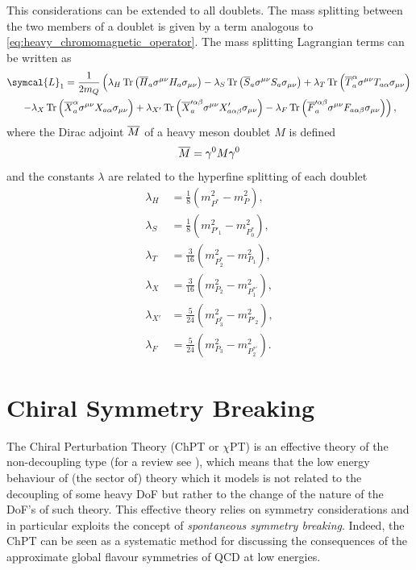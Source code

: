 This considerations can be extended to all doublets. The mass splitting between the two members of a doublet is given by a term analogous to \eqref{eq:heavy_chromomagnetic_operator}. The mass splitting Lagrangian terms can be written as
\begin{multline}
  \symcal{L}_1 = \frac{1}{2 m_Q} \left( 
      \lambda_H \tr{\left( \adj{H}_a \sigma^{\mu \nu} H_a \sigma_{\mu \nu} \right)} 
    - \lambda_S \tr{\left( \adj{S}_a \sigma^{\mu \nu} S_a \sigma_{\mu \nu} \right)}
    + \lambda_T \tr{\left( \adj{T}^\alpha_a \sigma^{\mu \nu} T_{a \alpha} \sigma_{\mu \nu} \right)} 
    \right. \\ \left.
    - \lambda_X \tr{\left( \adj{X}^\alpha_a \sigma^{\mu \nu} X_{a \alpha} \sigma_{\mu \nu} \right)} 
    + \lambda_{X'} \tr{\left( \adj{X}^{\prime \alpha \beta}_a \sigma^{\mu \nu} X'_{a \alpha \beta} \sigma_{\mu \nu} \right)} 
    - \lambda_F \tr{\left( \adj{F}^{\prime \alpha \beta}_a \sigma^{\mu \nu} F_{a \alpha \beta} \sigma_{\mu \nu} \right)} 
  \right) ,
\end{multline}
where the Dirac adjoint $\overline{M}$ of a heavy meson doublet $M$ is defined
\begin{equation}
  \overline{M} = \gamma^0 M \gamma^0
\end{equation}
and the constants $\lambda$ are related to the hyperfine splitting of each doublet
\begin{subequations}
  \begin{align}
    \lambda_H &= \frac{1}{8} \left( m^2_{P^*} - m^2_P \right) , \\
    \lambda_S &= \frac{1}{8} \left( m^2_{P'_1} - m^2_{P^*_0} \right) , \\
    \lambda_T &= \frac{3}{16} \left( m^2_{P^*_2} - m^2_{P_1} \right) , \\
    \lambda_X &= \frac{3}{16} \left( m^2_{P_2} - m^2_{P^{* \prime}_1} \right) , \\
    \lambda_{X'} &= \frac{5}{24} \left( m^2_{P^*_3} - m^2_{P'_2} \right) , \\
    \lambda_F &= \frac{5}{24} \left( m^2_{P_3} - m^2_{P^{* \prime}_2} \right) .
  \end{align}
\end{subequations}

\section{Chiral Symmetry Breaking}

The Chiral Perturbation Theory (ChPT or $\chi$PT) is an effective theory of the non-decoupling type (for a review see \cite{Scherer:2002tk}), which means that the low energy behaviour of (the sector of) theory which it models is not related to the decoupling of some heavy DoF but rather to the change of the nature of the DoF's of such theory. This effective theory relies on symmetry considerations and in particular exploits the concept of \emph{spontaneous symmetry breaking}. Indeed, the ChPT can be seen as a systematic method for discussing the consequences of the approximate global flavour symmetries of QCD at low energies. 

